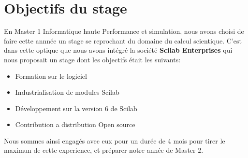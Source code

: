 \section*{Objectifs du stage}
En Master 1 Informatique haute Performance et simulation, nous avons choisi de faire cette annnée
un stage se reprochant du domaine du calcul scientique. C'est dans cette optique que nous avons
intégré la société {\bf Scilab Enterprises} qui nous proposait un stage dont les objectifs était 
les suivants:
\begin{itemize}
\item Formation sur le logiciel
\item Industrialisation de modules Scilab
\item Développement sur la version 6 de Scilab
\item Contribution a distribution Open source
\end{itemize}
Nous sommes ainsi engagés avec eux pour un durée de 4 mois pour tirer le maximun de cette experience,
et préparer notre année de Master 2.
